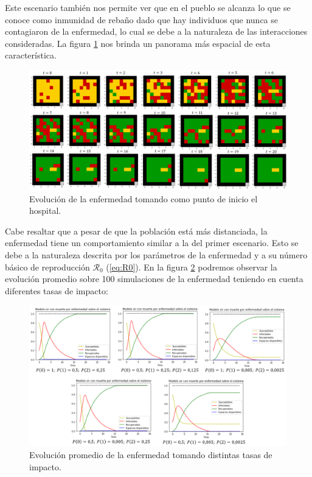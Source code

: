 Este escenario también nos permite ver que en el pueblo se alcanza lo que se conoce como inmunidad de rebaño dado que hay individuos que nunca se contagiaron de la enfermedad, lo cual se debe a la naturaleza de las interacciones consideradas. La figura \ref{fig:evo2} nos brinda un panorama más espacial de esta característica.

\begin{figure}[h]
  \centering
    \includegraphics[width=1.05\textwidth]{Imagenes/evo2.PNG}
    \caption{Evolución de la enfermedad tomando como punto de inicio el hospital.}
    \label{fig:evo2}
\end{figure}

Cabe resaltar que a pesar de que la población está más distanciada, la enfermedad tiene un comportamiento similar a la del primer escenario. Esto se debe a la naturaleza descrita por los parámetros de la enfermedad y a su número básico de reproducción $\mathcal{R}_0$ (\ref{eq:R0}). En la figura \ref{fig:comparacionTasasdeImpacto} podremos observar la evolución promedio sobre 100 simulaciones de la enfermedad teniendo en cuenta diferentes tasas de impacto:

\begin{figure}[h]
  \centering
    \includegraphics[width=1.05\textwidth]{Imagenes/comparacionTasasImpacto.PNG}
    \caption{Evolución promedio de la enfermedad tomando distintas tasas de impacto.}
    \label{fig:comparacionTasasdeImpacto}
\end{figure}

